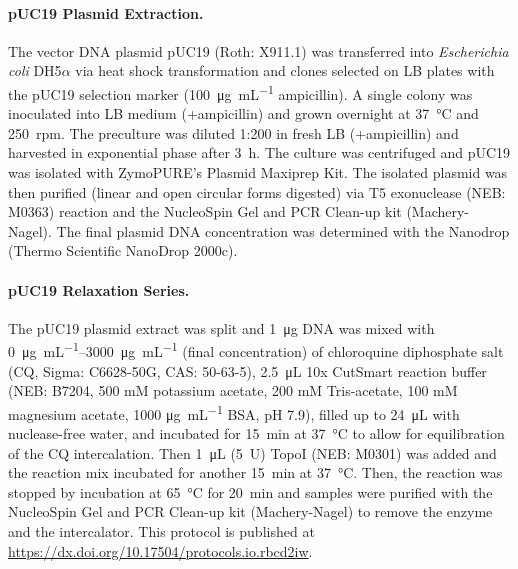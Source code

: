 \documentclass[10pt,a4]{article}
\newcommand{\ugml}{\micro\gram\per\milli\liter}
\begin{document}
\paragraph{pUC19 Plasmid Extraction.}
The vector DNA plasmid pUC19 (Roth: X911.1) was transferred into
\textit{Escherichia coli} DH5$\alpha$ via heat shock transformation
and clones selected on LB plates with the pUC19 selection marker
(\SI{100}{\ugml} ampicillin). A single colony was inoculated into LB
medium (+ampicillin) and grown overnight at \SI{37}{\celsius} and
\SI{250}{rpm}. The preculture was diluted 1:200 in fresh LB
(+ampicillin) and harvested in exponential phase after
\SI{3}{\hour}. The culture was centrifuged and pUC19 was isolated with
ZymoPURE's Plasmid Maxiprep Kit. The isolated plasmid was then
purified (linear and open circular forms digested) via T5 exonuclease
(NEB: M0363) reaction and the NucleoSpin Gel and PCR Clean-up kit
(Machery-Nagel). The final plasmid DNA concentration was determined
with the Nanodrop (Thermo Scientific NanoDrop 2000c).
%
\paragraph{pUC19 Relaxation Series.}
The pUC19 plasmid extract was split and \SI{1}{\ug} DNA was mixed with
\SIrange{0}{3000}{\ugml} (final concentration) of chloroquine
diphosphate salt (CQ, Sigma: C6628-50G, CAS: 50-63-5), \SI{2.5}{\uL}
10x CutSmart reaction buffer (NEB: B7204, 500 mM potassium acetate,
200 mM Tris-acetate, 100 mM magnesium acetate, 1000 \si{\ugml} BSA, pH
7.9), filled up to \SI{24}{\uL} with nuclease-free water, and
incubated for \SI{15}{\minute} at \SI{37}{\celsius} to allow for
equilibration of the CQ intercalation. Then \SI{1}{\uL} (\SI{5}{U})
TopoI (NEB: M0301) was added and the reaction mix incubated for
another \SI{15}{\minute} at \SI{37}{\celsius}. Then, the reaction was
stopped by incubation at \SI{65}{\celsius} for \SI{20}{\minute} and
samples were purified with the NucleoSpin Gel and PCR Clean-up kit
(Machery-Nagel) to remove the enzyme and the intercalator.  This
protocol is published at
\url{https://dx.doi.org/10.17504/protocols.io.rbcd2iw}.
\end{document}
